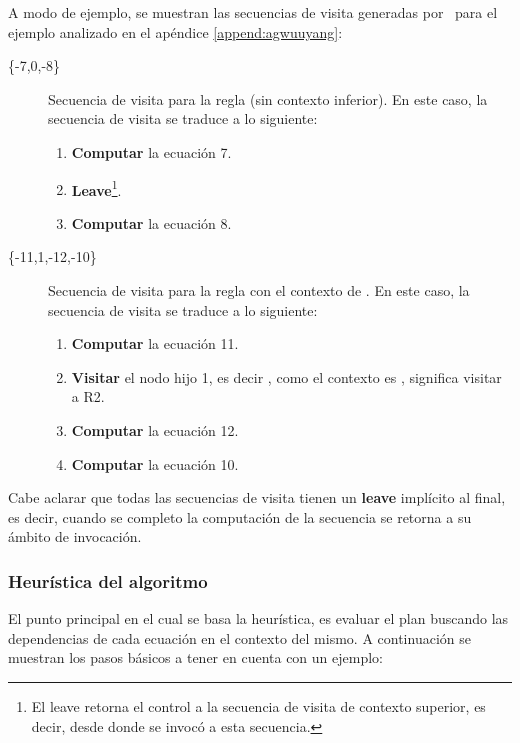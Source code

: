 A modo de ejemplo, se muestran las secuencias de visita generadas por \maggen\ para el ejemplo analizado en el apéndice \ref{append:agwuuyang}:

\begin{description}
\item [\{-7,0,-8\}] Secuencia de visita para la regla  (sin contexto inferior). En este caso, la secuencia de visita se traduce a lo siguiente:

\begin{enumerate}
\item \textbf{Computar} la ecuación 7.
\item \textbf{Leave}\footnote{El leave retorna el control a la secuencia de visita de contexto superior, es decir, desde donde se invocó a esta secuencia.}.
\item \textbf{Computar} la ecuación 8.
\end{enumerate}

\item [\{-11,1,-12,-10\}] Secuencia de visita para la regla  con el contexto de . En este caso, la secuencia de visita se traduce a lo siguiente:

\begin{enumerate}
\item \textbf{Computar} la ecuación 11.
\item \textbf{Visitar} el nodo hijo 1, es decir , como el contexto es , significa visitar a R2.
\item \textbf{Computar} la ecuación 12.
\item \textbf{Computar} la ecuación 10.
\end{enumerate}
\end{description}

Cabe aclarar que todas las secuencias de visita tienen un \textbf{leave} implícito al final, es decir, cuando se completo la computación de la secuencia se retorna a su ámbito de invocación.

\subsubsection{Heurística del algoritmo}
\label{subsec:heuris-simul}
El punto principal en el cual se basa la heurística, es evaluar el plan buscando las dependencias de cada ecuación en el contexto del mismo. A continuación se muestran los pasos básicos a tener en cuenta con un ejemplo:\\


